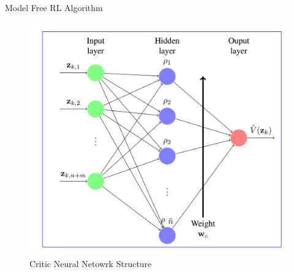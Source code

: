 \documentclass{beamer}
\begin{document}
\begin{frame}{Model Free RL Algorithm}
\begin{center}
\begin{figure}
\includegraphics[scale=0.15]{figs/img/criticNeuralNetwork}
\caption{Critic Neural Netowrk Structure}
\end{figure}
\end{center}
\end{frame}
\end{document}
